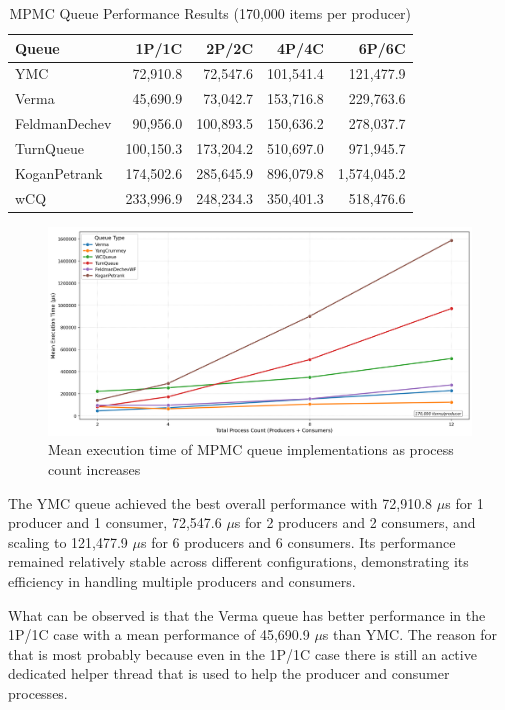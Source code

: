 \begin{table}[htb]
\centering
\caption{\ac{MPMC} Queue Performance Results (170,000 items per producer)}
\label{tab:mpmc-results}
\begin{tabular}{@{}lrrrr@{}}
\toprule
Queue & 1P/1C & 2P/2C & 4P/4C & 6P/6C \\
\midrule
\ac{YMC} & 72,910.8 & 72,547.6 & 101,541.4 & 121,477.9 \\
Verma & 45,690.9 & 73,042.7 & 153,716.8 & 229,763.6 \\
FeldmanDechev & 90,956.0 & 100,893.5 & 150,636.2 & 278,037.7 \\
TurnQueue & 100,150.3 & 173,204.2 & 510,697.0 & 971,945.7 \\
KoganPetrank & 174,502.6 & 285,645.9 & 896,079.8 & 1,574,045.2 \\
\ac{wCQ} & 233,996.9 & 248,234.3 & 350,401.3 & 518,476.6 \\
\bottomrule
\end{tabular}
\end{table}

\begin{figure}[htb]
\centering
\caption{Mean execution time of MPMC queue implementations as process count increases}
\label{fig:mpmc-mean-performance}
\includegraphics[width=\textwidth]{images/results/mpmc_mean_performance_vs_processes.png}
\end{figure}

The \ac{YMC} queue achieved the best overall performance with 72,910.8 $\mu$s for 1 producer and 1 consumer, 72,547.6 $\mu$s for 2 producers and 2 consumers, and scaling to 121,477.9 $\mu$s for 6 producers and 6 consumers. Its performance remained relatively stable across different configurations, demonstrating its efficiency in handling multiple producers and consumers.

What can be observed is that the Verma queue has better performance in the 1P/1C case with a mean performance of 45,690.9 $\mu$s than \ac{YMC}. The reason for that is most probably because even in the 1P/1C case there is still an active dedicated helper thread that is used to help the producer and consumer processes.

